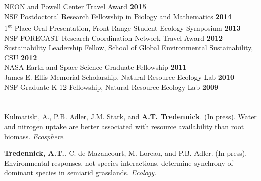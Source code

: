 \documentclass[margin,line]{resume}
\begin{document}
\begin{resume}
     \section{\textmd{\textsf{\color{MidnightBlue}{Fellowships \\and Awards}}}}
        		NEON and Powell Center Travel Award \hfill \textbf{2015}\vspace{.5mm}\\%
                NSF Postdoctoral Research Fellowship in Biology and Mathematics    \hfill \textbf{2014}\vspace{.5mm}\\%
                1\textsuperscript{st} Place Oral Presentation, Front Range Student Ecology Symposium  \hfill \textbf{2013}\vspace{.5mm}\\%
                NSF FORECAST Research Coordination Network Travel Award \hfill \textbf{2012}\vspace{.5mm}\\%
                Sustainability Leadership Fellow, School of Global Environmental Sustainability, CSU \hfill \textbf{2012}\vspace{.5mm}\\%
		NASA Earth and Space Science Graduate Fellowship  \hfill \textbf{2011}\vspace{.5mm}\\%
		James E. Ellis Memorial Scholarship, Natural Resource Ecology Lab  \hfill \textbf{2010}\vspace{.5mm}\\%
		NSF Graduate K-12 Fellowship, Natural Resource Ecology Lab                        \hfill\textbf{2009}%
   
      \section{\textmd{\textsf{\color{MidnightBlue}{Publications}}}}
      
      Kulmatiski, A., P.B. Adler, J.M. Stark, and \textbf{A.T. Tredennick}. (In press). Water and nitrogen uptake are better associated with resource availability than root biomass. \emph{Ecosphere}.
      
      \textbf{Tredennick, A.T.}, C. de Mazancourt, M. Loreau, and P.B. Adler. (In press). Environmental responses, not species interactions, determine synchrony of dominant species in semiarid grasslands. \emph{Ecology}.
	

\end{resume}
\end{document}
